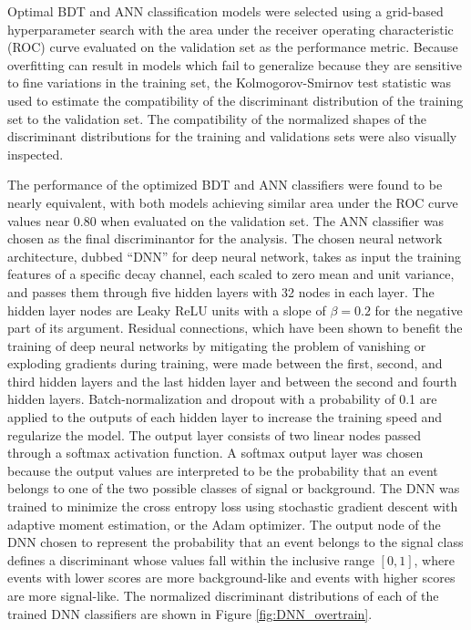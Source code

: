Optimal BDT and ANN classification models were selected using a grid-based hyperparameter search with the area under the receiver operating characteristic (ROC) curve evaluated on the validation set as the performance metric. Because overfitting can result in models which fail to generalize because they are sensitive to fine variations in the training set, the Kolmogorov-Smirnov test statistic was used to estimate the compatibility of the discriminant distribution of the training set to the validation set. The compatibility of the normalized shapes of the discriminant distributions for the training and validations sets were also visually inspected.

The performance of the optimized BDT and ANN classifiers were found to be nearly equivalent, with both models achieving similar area under the ROC curve values near 0.80 when evaluated on the validation set. The ANN classifier was chosen as the final discriminantor for the analysis. The chosen neural network architecture, dubbed ``DNN'' for deep neural network, takes as input the training features of a specific decay channel, each scaled to zero mean and unit variance, and passes them through five hidden layers with 32 nodes in each layer. The hidden layer nodes are Leaky ReLU units with a slope of $\beta = 0.2$ for the negative part of its argument. Residual connections\cite{RESCONNECT}, which have been shown to benefit the training of deep neural networks by mitigating the problem of vanishing or exploding gradients during training, were made between the first, second, and third hidden layers and the last hidden layer and between the second and fourth hidden layers. Batch-normalization and dropout with a probability of 0.1 are applied to the outputs of each hidden layer to increase the training speed and regularize the model. The output layer consists of two linear nodes passed through a softmax activation function. A softmax output layer was chosen because the output values are interpreted to be the probability that an event belongs to one of the two possible classes of signal or background. The DNN was trained to minimize the cross entropy loss using stochastic gradient descent with adaptive moment estimation, or the Adam optimizer. The output node of the DNN chosen to represent the probability that an event belongs to the signal class defines a discriminant whose values fall within the inclusive range $[0, 1]$, where events with lower scores are more background-like and events with higher scores are more signal-like. The normalized discriminant distributions of each of the trained DNN classifiers are shown in Figure \ref{fig:DNN_overtrain}. 


